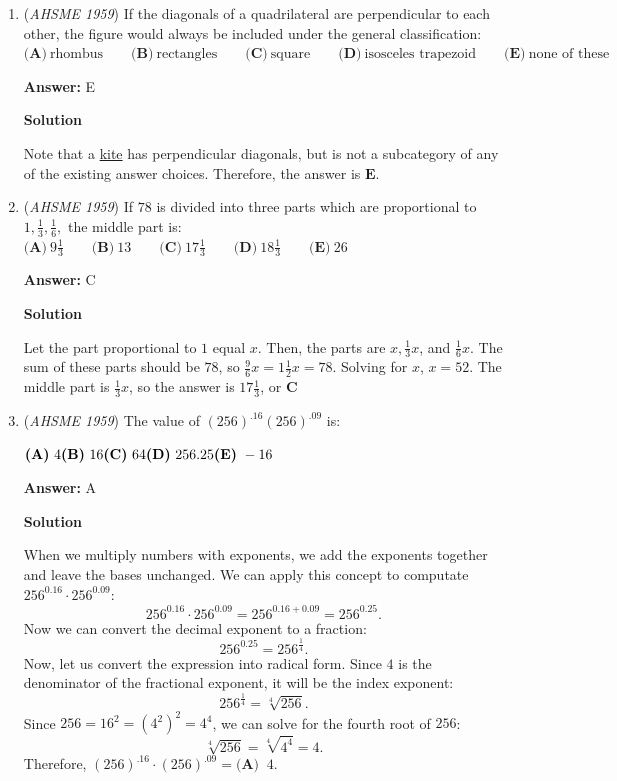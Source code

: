 \begin{enumerate}
 


	\item (\textit{AHSME 1959}) If the diagonals of a quadrilateral are perpendicular to each other, the figure would always be included under the general classification:
$\textbf{(A)}\ \text{rhombus} \qquad\textbf{(B)}\ \text{rectangles} \qquad\textbf{(C)}\ \text{square} \qquad\textbf{(D)}\ \text{isosceles trapezoid}\qquad\textbf{(E)}\ \text{none of these}$

 \textbf{Answer: }E



\textbf{Solution}

Note that a \href{https://artofproblemsolving.com/wiki/index.php?title=Kite}{kite} has perpendicular diagonals, but is not a subcategory of any of the existing answer choices. Therefore, the answer is $\boxed{\textbf{E}}$.

 


	\item (\textit{AHSME 1959}) If $78$ is divided into three parts which are proportional to $1, \frac13, \frac16,$ the middle part is:
$\textbf{(A)}\ 9\frac13 \qquad\textbf{(B)}\ 13\qquad\textbf{(C)}\ 17\frac13 \qquad\textbf{(D)}\ 18\frac13\qquad\textbf{(E)}\ 26$

 \textbf{Answer: }C



\textbf{Solution}

Let the part proportional to $1$ equal $x$. Then, the parts are $x, \frac{1}{3}x$, and $\frac{1}{6}x$. The sum of these parts should be $78$, so $\frac{9}{6}x=1\frac{1}{2}x=78$. Solving for $x$, $x=52$. The middle part is $\frac{1}{3}x$, so the answer is $17\frac{1}{3}$, or $\boxed{\textbf{C}}$



	\item (\textit{AHSME 1959}) The value of $\left(256\right)^{.16}\left(256\right)^{.09}$ is:


 $\textbf{(A)}\ 4 \qquad \\ \textbf{(B)}\ 16\qquad \\ \textbf{(C)}\ 64\qquad \\ \textbf{(D)}\ 256.25\qquad \\ \textbf{(E)}\ -16$

 \textbf{Answer: }A



\textbf{Solution}

When we multiply numbers with exponents, we add the exponents together and leave the bases unchanged. We can apply this concept to computate $256^{0.16} \cdot 256^{0.09}$: 
 \[256^{0.16} \cdot 256^{0.09} = 256^{0.16+0.09}=256^{0.25}.\]Now we can convert the decimal exponent to a fraction: 
 \[256^{0.25} = 256^{\frac{1}{4}}.\]Now, let us convert the expression into radical form. Since $4$ is the denominator of the fractional exponent, it will be the index exponent: 
 \[256^{\frac{1}{4}}=\sqrt[4]{256}.\]Since $256 =16^2=(4^2)^2=4^4$, we can solve for the fourth root of $256$: 
 \[\sqrt[4]{256}=\sqrt[4]{4^4}=4.\]Therefore, $(256)^{.16} \cdot (256)^{.09}=\boxed{\textbf{(A) }\ 4}.$




\end{enumerate}
